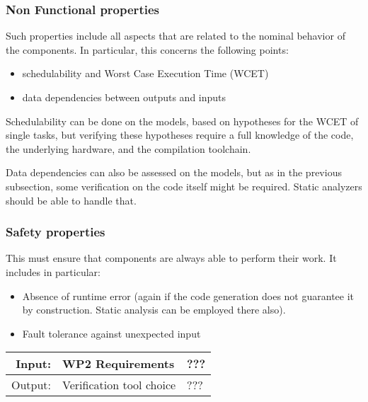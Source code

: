\documentclass[11pt, a4paper]{article}
\newenvironment{inoutput}
{\vspace{2mm}
\noindent
\begin{tabular}{|r|p{.7\linewidth}|l|}
\hline}
{
\hline
\end{tabular}}
\begin{document}
\subsubsection{Non Functional properties}

Such properties include all aspects that are related to the nominal behavior
of the components. In particular, this concerns the following points:
\begin{itemize}
\item schedulability and Worst Case Execution Time (WCET)
\item data dependencies between outputs and inputs
\end{itemize}

Schedulability can be done on the models, based on hypotheses for the WCET of
single tasks, but verifying these hypotheses require a full knowledge of
the code, the underlying hardware, and the compilation toolchain.

Data dependencies can also be assessed on the models, but as in the previous
subsection, some verification on the code itself might be required. Static
analyzers should be able to handle that.

\subsubsection{Safety properties}

This must ensure that components are always able to perform their work.
It includes in particular:
\begin{itemize}
  \item Absence of runtime error (again if the code generation does
        not guarantee it by construction. Static analysis can be employed
        there also).
  \item Fault tolerance against unexpected input
\end{itemize}

\begin{inoutput}
Input: & WP2 Requirements & ??? \\
\hline
Output: & Verification tool choice & ??? \\
\end{inoutput}


\end{document}
